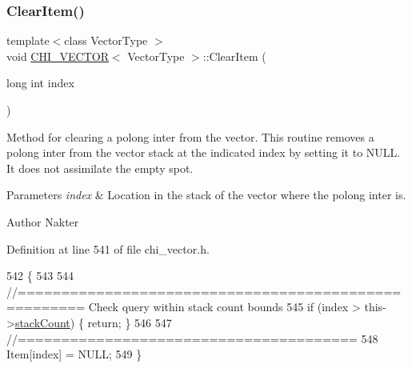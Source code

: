 \mbox{\label{class_c_h_i___v_e_c_t_o_r_a218fc2c4e4307955a008aba0a25989db_a218fc2c4e4307955a008aba0a25989db}} 
\subsubsection{\texorpdfstring{Clear\+Item()}{ClearItem()}}
{\footnotesize\ttfamily template$<$class Vector\+Type $>$ \\
void \hyperlink{class_c_h_i___v_e_c_t_o_r}{C\+H\+I\+\_\+\+V\+E\+C\+T\+OR}$<$ Vector\+Type $>$\+::Clear\+Item (\begin{DoxyParamCaption}\item[{long int}]{index }\end{DoxyParamCaption})}

Method for clearing a polong inter from the vector. This routine removes a polong inter from the vector stack at the indicated index by setting it to N\+U\+LL. It does not assimilate the empty spot.


\begin{DoxyParams}{Parameters}
{\em index} & Location in the stack of the vector where the polong inter is.\\
\hline
\end{DoxyParams}
\begin{DoxyAuthor}{Author}
Nakter 
\end{DoxyAuthor}


Definition at line 541 of file chi\+\_\+vector.\+h.


\begin{DoxyCode}
542 \{
543 
544     \textcolor{comment}{//===================================================== Check query within stack count bounds}
545     \textcolor{keywordflow}{if} (index > this->\hyperlink{class_c_h_i___v_e_c_t_o_r_a91ef30712b0ead293dfe1adc29fee555}{stackCount}) \{ \textcolor{keywordflow}{return}; \}
546 
547     \textcolor{comment}{//=======================================}
548     Item[index] = NULL;
549 \}
\end{DoxyCode}
\mbox{\label{class_c_h_i___v_e_c_t_o_r_abc2f116e9f1b9f4bfb192c484d6dd71d_abc2f116e9f1b9f4bfb192c484d6dd71d}} 

